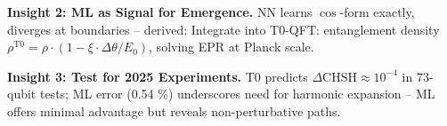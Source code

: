 	\begin{important}
		\textbf{Insight 2: ML as Signal for Emergence.} NN learns $\cos$-form exactly, diverges at boundaries – derived: Integrate into T0-QFT: entanglement density $\rho^{\mathrm{T0}} = \rho \cdot (1 - \xi \cdot \Delta \theta / E_0)$, solving EPR at Planck scale.
	\end{important}
	
	\begin{warning}
		\textbf{Insight 3: Test for 2025 Experiments.} T0 predicts $\Delta \mathrm{CHSH} \approx 10^{-4}$ in 73-qubit tests\cite{sciencedaily2025}; ML error (0.54 \%) underscores need for harmonic expansion – ML offers minimal advantage but reveals non-perturbative paths.
	\end{warning}
